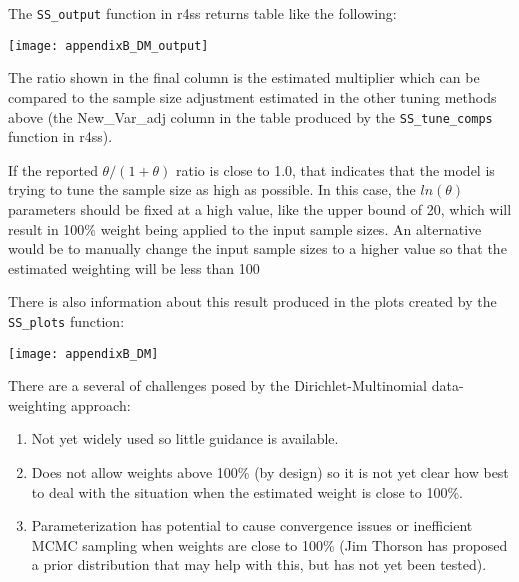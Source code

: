The \texttt{SS\_output} function in r4ss returns table like the following:

\begin{center}
	\texttt{[image: appendixB\_DM\_output]}\\
\end{center}

The ratio shown in the final column is the estimated multiplier which can be compared to the sample size adjustment estimated in the other tuning methods above (the New\_Var\_adj column in the table produced by the \texttt{SS\_tune\_comps} function in r4ss).

If the reported $\theta/(1+\theta)$ ratio is close to 1.0, that indicates that the model is trying to tune the sample size as high as possible. In this case, the $ln(\theta)$ parameters should be fixed at a high value, like the upper bound of 20, which will result in 100\% weight being applied to the input sample sizes. An alternative would be to manually change the input sample sizes to a higher value so that the estimated weighting will be less than 100%

There is also information about this result produced in the plots created by the \texttt{SS\_plots} function:

\begin{center}
	\texttt{[image: appendixB\_DM]}\\
\end{center}

There are a several of challenges posed by the Dirichlet-Multinomial data-weighting approach:
\begin{enumerate}
	\item Not yet widely used so little guidance is available.
	
	\item Does not allow weights above 100\% (by design) so it is not yet clear how best to deal with the situation when the estimated weight is close to 100\%.
	
	\item Parameterization has potential to cause convergence issues or inefficient MCMC sampling when weights are close to 100\% (Jim Thorson has proposed a prior distribution that may help with this, but has not yet been tested).
\end{enumerate}